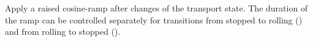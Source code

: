 Apply a raised cosine-ramp after changes of the transport state. The
duration of the ramp can be controlled separately for transitions from
stopped to rolling () and from rolling to stopped
().


